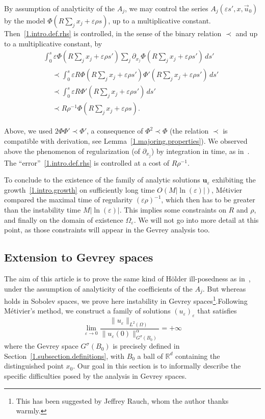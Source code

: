 \documentclass[10pt]{amsart}
\theoremstyle{definition}
\theoremstyle{plain}
\newcommand*\e{\varepsilon}
\newcommand*\R{{\mathbb R}}
\newcommand{\dptl}{\partial}%
\newcommand{\alf}{\alpha}%
\newcommand{\ubf}{{\mathbf u}}
\begin{document}
By assumption of analyticity of the $A_j$, we may control the series $A_j(\e s',x, \vec{u}_0)$ by the model $\Phi(R \sum_j x_j + \e\rho s)$, up to a multiplicative constant. Then~\eqref{1.intro.def.rhs} is controlled, in the sense of the binary relation $\prec$ and up to a multiplicative constant, by
\begin{multline*}
\int_{0}^{s} \e \Phi(R \sum_j x_j + \e\rho s') \sum_j \dptl_{x_j} \Phi\left(R \sum_j x_j + \e\rho s'\right) \, ds' \\
\begin{aligned}
& \prec \int_{0}^{s} \e R \Phi(R \sum_j x_j + \e\rho s') \Phi'\left(R \sum_j x_j + \e\rho s'\right) \, ds' \\
& \prec \int_{0}^{s} \e R \Phi'\left(R \sum_j x_j + \e\rho s'\right) \, ds' \\
& \prec R\rho^{-1} \Phi\left(R \sum_j x_j + \e\rho s\right).
\end{aligned}
\end{multline*}


Above, we used $2\Phi \Phi' \prec \Phi'$, a consequence of $\Phi^2 \prec \Phi$ (the relation $\prec$ is compatible with derivation, see Lemma~\ref{1.majoring.properties}). We observed above the phenomenon of regularization (of $\dptl_{x_j}$) by integration in time, as in~\cite{ukai2001boltzmann}. The ``error''~\eqref{1.intro.def.rhs} is controlled at a cost of $R\rho^{-1}$.

To conclude to the existence of the family of analytic solutions $\ubf_{\e}$ exhibiting the growth~\eqref{1.intro.growth} on sufficiently long time $O(M|\ln(\e)|)$, Métivier compared the maximal time of regularity $(\e\rho)^{-1}$, which then has to be greater than the instability time $M|\ln(\e)|$. This implies some constraints on $R$ and $\rho$, and finally on the domain of existence $\Omega_{\e}$. We will not go into more detail at this point, as those constraints will appear in the Gevrey analysis too.


\subsection{Extension to Gevrey spaces}\label{1.intro.extension}


The aim of this article is to prove the same kind of H\"older ill-posedness as in~\cite{metivier2005remarks}, under the assumption of analyticity of the coefficients of the $A_j$. But whereas~\cite{metivier2005remarks} holds in Sobolev spaces, we prove here instability in Gevrey spaces\footnote{This has been suggested by Jeffrey Rauch, whom the author thanks warmly.}.\linebreak Following Métivier's method, we construct a family of solutions $(u_{\e})_{\e}$ that satisfies
\begin{equation}\label{1.intro.holder.gevrey}
\lim_{\e\to0} \frac{\|u_{\e}\|_{L^2(\Omega)}}{\|u_{\e}(0)\|^{\alf}_{G^{\sigma}(B_0)}} = +\infty
\end{equation}
where the Gevrey space $G^{\sigma}(B_0)$ is precisely defined in Section~\ref{1.subsection.definitions}, with $B_0$ a ball of $\R^{d}$ containing the distinguished point $x_0$. Our goal in this section is to informally describe the specific difficulties posed by the analysis in Gevrey spaces.
\end{document}
